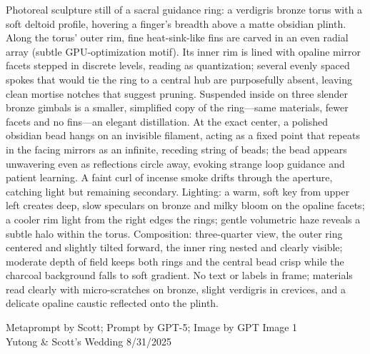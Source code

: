 \documentclass[12pt]{article}
\begin{document}
\noindent
\begin{adjustbox}{max size={\textwidth}{\textheight}}
\begin{varwidth}{\textwidth}
\RaggedRight
\footnotesize
Photoreal sculpture still of a sacral guidance ring: a verdigris bronze torus with a soft deltoid profile, hovering a finger’s breadth above a matte obsidian plinth. Along the torus’ outer rim, fine heat-sink-like fins are carved in an even radial array (subtle GPU-optimization motif). Its inner rim is lined with opaline mirror facets stepped in discrete levels, reading as quantization; several evenly spaced spokes that would tie the ring to a central hub are purposefully absent, leaving clean mortise notches that suggest pruning. Suspended inside on three slender bronze gimbals is a smaller, simplified copy of the ring—same materials, fewer facets and no fins—an elegant distillation. At the exact center, a polished obsidian bead hangs on an invisible filament, acting as a fixed point that repeats in the facing mirrors as an infinite, receding string of beads; the bead appears unwavering even as reflections circle away, evoking strange loop guidance and patient learning. A faint curl of incense smoke drifts through the aperture, catching light but remaining secondary. Lighting: a warm, soft key from upper left creates deep, slow speculars on bronze and milky bloom on the opaline facets; a cooler rim light from the right edges the rings; gentle volumetric haze reveals a subtle halo within the torus. Composition: three-quarter view, the outer ring centered and slightly tilted forward, the inner ring nested and clearly visible; moderate depth of field keeps both rings and the central bead crisp while the charcoal background falls to soft gradient. No text or labels in frame; materials read clearly with micro-scratches on bronze, slight verdigris in crevices, and a delicate opaline caustic reflected onto the plinth.
\end{varwidth}
\end{adjustbox}
\vfill
{\raggedleft\footnotesize
Metaprompt by Scott; Prompt by GPT-5; Image by GPT Image 1 \\
Yutong \& Scott's Wedding 8/31/2025\par}
\end{document}
